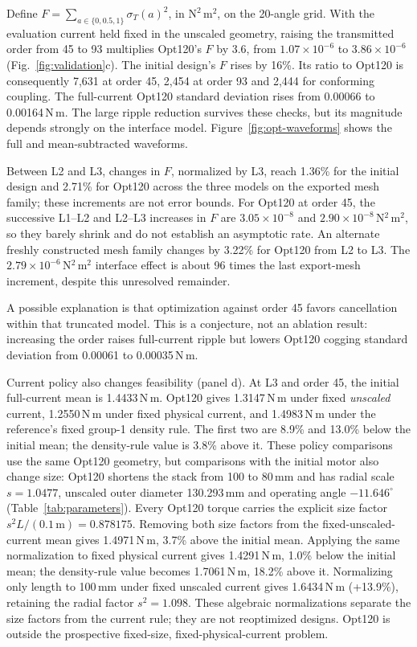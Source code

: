 \documentclass{anvil-paper}
\begin{document}
Define $F=\sum_{a\in\{0,0.5,1\}}\sigma_T(a)^2$, in
$\mathrm{N^2\,m^2}$, on the 20-angle grid. With the evaluation current
held fixed in the unscaled geometry, raising the transmitted order from
45 to 93 multiplies Opt120's $F$ by 3.6, from $1.07\times10^{-6}$ to
$3.86\times10^{-6}$ (Fig.~\ref{fig:validation}c). The initial design's
$F$ rises by 16\%. Its ratio to Opt120 is consequently 7,631 at order 45,
2,454 at order 93 and 2,444 for conforming coupling. The full-current
Opt120 standard deviation rises from 0.00066 to 0.00164\,N\,m.
The large ripple reduction survives these checks, but its magnitude
depends strongly on the interface model. Figure~\ref{fig:opt-waveforms}
shows the full and mean-subtracted waveforms.

Between L2 and L3, changes in
$F$, normalized by L3, reach 1.36\% for the initial design and 2.71\%
for Opt120 across the three models on the exported mesh family; these increments are not error bounds.
For Opt120 at order 45, the successive L1--L2 and L2--L3 increases in $F$
are $3.05\times10^{-8}$ and $2.90\times10^{-8}$\,N$^2$\,m$^2$,
so they barely shrink and do not establish an asymptotic rate. An alternate
freshly constructed mesh family changes by 3.22\% for Opt120 from L2 to L3.
The $2.79\times10^{-6}$\,N$^2$\,m$^2$ interface effect is about
96 times the last export-mesh increment, despite this unresolved remainder.

A possible explanation is that optimization against order 45 favors
cancellation within that truncated model. This is a conjecture, not an
ablation result: increasing the order raises full-current ripple but
lowers Opt120 cogging standard deviation from 0.00061 to 0.00035\,N\,m.

Current policy also changes feasibility (panel d). At L3 and order 45,
the initial full-current mean is 1.4433\,N\,m. Opt120 gives 1.3147\,N\,m
under fixed \emph{unscaled} current, 1.2550\,N\,m under fixed physical
current, and 1.4983\,N\,m under the reference's fixed group-1 density rule.
The first two are 8.9\% and 13.0\% below the initial mean; the density-rule
value is 3.8\% above it. These policy comparisons use the same Opt120
geometry, but comparisons with the initial motor also change size:
Opt120 shortens the stack from 100 to 80\,mm and has radial scale
$s=1.0477$, unscaled outer diameter 130.293\,mm and operating angle
$-11.646^\circ$ (Table~\ref{tab:parameters}). Every Opt120 torque carries
the explicit size factor $s^2L/(0.1\,\mathrm{m})=0.878175$.
Removing both size factors from the fixed-unscaled-current mean gives
1.4971\,N\,m, 3.7\% above the initial mean. Applying the same normalization
to fixed physical current gives 1.4291\,N\,m, 1.0\% below the initial mean;
the density-rule value becomes 1.7061\,N\,m, 18.2\% above it. Normalizing
only length to 100\,mm under fixed unscaled current gives 1.6434\,N\,m
(+13.9\%), retaining the radial factor $s^2=1.098$.
These algebraic normalizations separate the size factors from the current
rule; they are not reoptimized designs. Opt120 is outside the prospective
fixed-size, fixed-physical-current problem.
\end{document}
